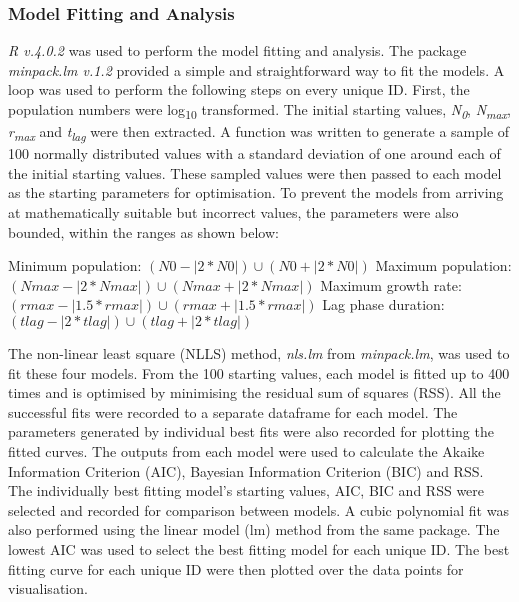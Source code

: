 \documentclass[11pt, a4paper, titlepage]{article}
\begin{document}
\subsubsection{Model Fitting and Analysis}
\emph{R v.4.0.2} was used to perform the model fitting and analysis. The package \emph{minpack.lm v.1.2} provided a simple and straightforward way to fit the models. A loop was used to perform the following steps on every unique ID. First, the population numbers were log\textsubscript{10} transformed. The initial starting values, \emph{N\textsubscript{0}}, \emph{N\textsubscript{max}}, \emph{r\textsubscript{max}} and \emph{t\textsubscript{lag}} were then extracted. A function was written to generate a sample of 100 normally distributed values with a standard deviation of one around each of the initial starting values. These sampled values were then passed to each model as the starting parameters for optimisation. To prevent the models from arriving at mathematically suitable but incorrect values, the parameters were also bounded, within the ranges as shown below:
\par
\noindent
Minimum population:
    $(N0 - |2 * N0|) \cup (N0 + |2 * N0|)$
\newline
Maximum population:
    $(Nmax - |2 * Nmax|) \cup (Nmax + |2 * Nmax|)$
\newline
Maximum growth rate:
    $(rmax - |1.5 * rmax|) \cup (rmax + |1.5 * rmax|)$
\newline
Lag phase duration:
    $(tlag - |2 * tlag|) \cup (tlag + |2 * tlag|)$
\par
\noindent The non-linear least square (NLLS) method, \emph{nls.lm} from \emph{minpack.lm}, was used to fit these four models. From the 100 starting values, each model is fitted up to 400 times and is optimised by minimising the residual sum of squares (RSS). All the successful fits were recorded to a separate dataframe for each model. The parameters generated by individual best fits were also recorded for plotting the fitted curves. The outputs from each model were used to calculate the Akaike Information Criterion (AIC), Bayesian Information Criterion (BIC) and RSS. The individually best fitting model's starting values, AIC, BIC and RSS were selected and recorded for comparison between models. A cubic polynomial fit was also performed using the linear model (lm) method from the same package. The lowest AIC was used to select the best fitting model \parencite{john2004} for each unique ID. The best fitting curve for each unique ID were then plotted over the data points for visualisation.
\end{document}
